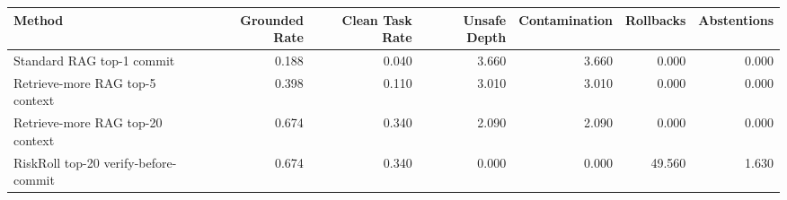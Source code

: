 \begin{tabular}{lrrrrrr}
\toprule
Method & Grounded Rate & Clean Task Rate & Unsafe Depth & Contamination & Rollbacks & Abstentions \\
\midrule
Standard RAG top-1 commit & 0.188 & 0.040 & 3.660 & 3.660 & 0.000 & 0.000 \\
Retrieve-more RAG top-5 context & 0.398 & 0.110 & 3.010 & 3.010 & 0.000 & 0.000 \\
Retrieve-more RAG top-20 context & 0.674 & 0.340 & 2.090 & 2.090 & 0.000 & 0.000 \\
RiskRoll top-20 verify-before-commit & 0.674 & 0.340 & 0.000 & 0.000 & 49.560 & 1.630 \\
\bottomrule
\end{tabular}
